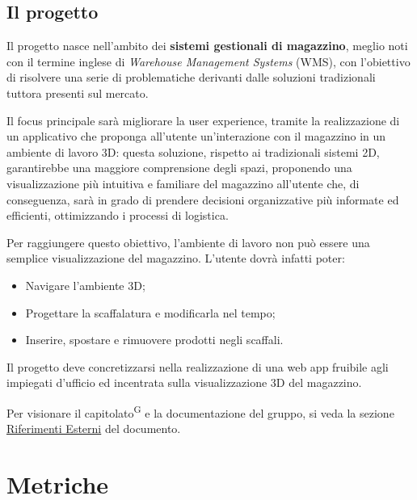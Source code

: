 \subsection{Il progetto}\label{sec:il_progetto}
\par Il progetto nasce nell'ambito dei \textbf{sistemi gestionali di magazzino}, meglio noti con il termine inglese di \textit{Warehouse Management Systems} (WMS), con l'obiettivo di risolvere una serie di problematiche derivanti dalle soluzioni tradizionali tuttora presenti sul mercato.
\par Il focus principale sarà migliorare la user experience, tramite la realizzazione di un applicativo che proponga all'utente un'interazione con il magazzino in un ambiente di lavoro 3D: questa soluzione, rispetto ai tradizionali sistemi 2D, garantirebbe una maggiore comprensione degli spazi, proponendo una visualizzazione più intuitiva e familiare del magazzino all'utente che, di conseguenza, sarà in grado di prendere decisioni organizzative più informate ed efficienti, ottimizzando i processi di logistica.
\par Per raggiungere questo obiettivo, l'ambiente di lavoro non può essere una semplice visualizzazione del magazzino. L'utente dovrà infatti poter:
\begin{itemize}
    \item Navigare l'ambiente 3D;
    \item Progettare la scaffalatura e modificarla nel tempo;
    \item Inserire, spostare e rimuovere prodotti negli scaffali.
\end{itemize}
Il progetto deve concretizzarsi nella realizzazione di una web app fruibile agli impiegati d'ufficio ed incentrata sulla visualizzazione 3D del magazzino.
\par Per visionare il capitolato\textsuperscript{G} e la documentazione del gruppo, si veda la sezione \hyperref[sec:riferimenti_esterni]{Riferimenti Esterni} del documento.


\newpage

\section{Metriche}\label{sec:metriche}
